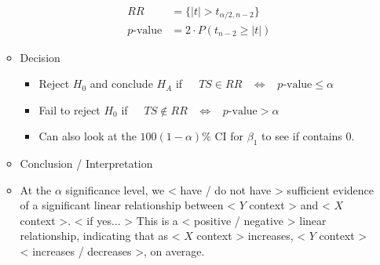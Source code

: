 \documentclass{article}
\begin{document}
\begin{itemize}
\begin{itemize}
\begin{align*}
          RR &= \{\lvert t \rvert > t_{\alpha/2, n - 2}\} \\
          p\text{-value} &= 2 \cdot P(t_{n-2} \ge \lvert t \rvert)
        \end{align*}
        \item Decision
        \begin{itemize}
            \item Reject $H_0$ and conclude $H_A$ if $\hspace{10pt}$ $TS \in RR \hspace{10pt} \Longleftrightarrow \hspace{10pt} p\text{-value} \le \alpha$
            \item Fail to reject $H_0$ if $\hspace{10pt}$ $TS \notin RR \hspace{10pt} \Longleftrightarrow \hspace{10pt} p\text{-value} > \alpha$
            \item Can also look at the $100(1 - \alpha)\%$ CI for $\beta_1$ to see if contains 0.
        \end{itemize}
        \item Conclusion / Interpretation
        \item[] At the $\alpha$ significance level, we < have / do not have > sufficient evidence of a significant linear relationship between < $Y$ context > and < $X$ context >. < if yes... > This is a < positive / negative > linear relationship, indicating that as < $X$ context > increases, < $Y$ context > < increases / decreases >, on average.
    \end{itemize}
\end{itemize}

\newpage
\end{document}
